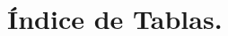 \chapter*{\sloppy Índice de Tablas.}

\renewcommand{\listtablename}{\fontsize{12}{18}\selectfont Contenido.}
\renewcommand{\cfttableader}{\cftdotfill{\cftdotsep}}

\setlength{\cftbeforelottitleskip}{1pt}
\setlength{\cftafterlottitleskip}{0pt}

\setlength{\cfttabindent}{0pt}

\setlength{\cftbeforetabskip}{0pt}
\renewcommand{\cfttabfont}{\normalfont}
\renewcommand{\cfttabpagefont}{\normalfont}

\renewcommand{\cfttabpresnum}{Tabla~}
\renewcommand{\cfttabnumwidth}{4em}

\listoftables